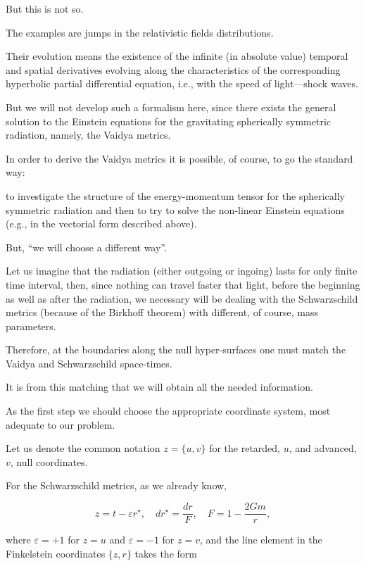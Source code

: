But this is not so. 

The examples are jumps in the relativistic fields distributions. 

Their evolution means the existence of the infinite (in absolute value) temporal and spatial derivatives   evolving along the characteristics of the corresponding hyperbolic partial differential equation, i.e., with the speed of light---shock waves. 

But we will not develop  such a formalism here, since there exists the general solution to the Einstein equations for the gravitating spherically symmetric radiation, namely, the Vaidya metrics.



In order to derive the Vaidya metrics it is possible, of course, to go  the standard way: 

to investigate the structure of the energy-momentum tensor for the spherically symmetric radiation and then to try to solve the non-linear Einstein equations (e.g., in the vectorial form described above).

But, ``we will choose a different way''. 

Let us imagine  that the radiation (either outgoing or ingoing) lasts for only finite time interval, then, since nothing can travel faster that light, before the beginning as well as after the radiation, we necessary will be dealing with the Schwarzschild metrics (because of the Birkhoff theorem) with different, of course, mass parameters. 

Therefore, at the boundaries along the null hyper-surfaces one must match the Vaidya and Schwarzschild space-times. 

It is from this matching that we will obtain all the needed information.



As the first step we should choose the appropriate coordinate system, most adequate to our problem. 

Let us denote the common notation $z = \{u, v\}$ for the retarded, $u$, and advanced, $v$, null coordinates. 

For the Schwarzschild metrics, as we already know, 

$$

z = t - \varepsilon r^{\star}, \quad  dr^{\star} = \frac{dr}{F} , \quad  F = 1 - \frac{2 G m }{r},

$$ 

where $\varepsilon = + 1$ for $z = u$ and $\varepsilon = - 1$ for $z = v$, and the line element in the Finkelstein coordinates $\{z, r\}$ takes the form

